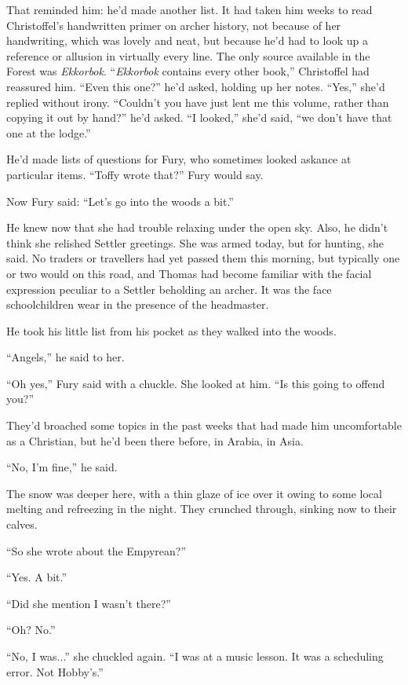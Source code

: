 \documentclass[11pt,a5paper]{article}
\begin{document}
That reminded him: he'd made another list. It had taken him weeks to read Christoffel's handwritten primer on archer history, not because of her handwriting, which was lovely and neat, but because he'd had to look up a reference or allusion in virtually every line. The only source available in the Forest was \emph{Ekkorbok}. ``\emph{Ekkorbok} contains every other book,'' Christoffel had reassured him. ``Even this one?'' he'd asked, holding up her notes. ``Yes,'' she'd replied without irony. ``Couldn't you have just lent me this volume, rather than copying it out by hand?'' he'd asked. ``I looked,'' she'd said, ``we don't have that one at the lodge.''

He'd made lists of questions for Fury, who sometimes looked askance at particular items. ``Toffy wrote that?'' Fury would say.

Now Fury said: ``Let's go into the woods a bit.''

He knew now that she had trouble relaxing under the open sky. Also, he didn't think she relished Settler greetings. She was armed today, but for hunting, she said. No traders or travellers had yet passed them this morning, but typically one or two would on this road, and Thomas had become familiar with the facial expression peculiar to a Settler beholding an archer. It was the face schoolchildren wear in the presence of the headmaster.

He took his little list from his pocket as they walked into the woods.

``Angels,'' he said to her.

``Oh yes,'' Fury said with a chuckle. She looked at him. ``Is this going to offend you?''

They'd broached some topics in the past weeks that had made him uncomfortable as a Christian, but he'd been there before, in Arabia, in Asia.

``No, I'm fine,'' he said.

The snow was deeper here, with a thin glaze of ice over it owing to some local melting and refreezing in the night. They crunched through, sinking now to their calves.

``So she wrote about the Empyrean?''

``Yes. A bit.''

``Did she mention I wasn't there?''

``Oh? No.''

``No, I was...'' she chuckled again. ``I was at a music lesson. It was a scheduling error. Not Hobby's.''
\end{document}
